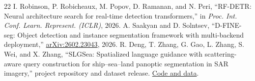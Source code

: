 \documentclass[journal]{IEEEtran}
\begin{document}
\begin{thebibliography}{22}
 I. Robinson, P. Robicheaux, M. Popov, D. Ramanan, and N. Peri, ``RF-DETR: Neural architecture search for real-time detection transformers,'' in \emph{Proc. Int. Conf. Learn. Represent. (ICLR)}, 2026.
 A. Saakyan and D. Solntsev, ``D-FINE-seg: Object detection and instance segmentation framework with multi-backend deployment,'' \href{https://arxiv.org/abs/2602.23043}{arXiv:2602.23043}, 2026.
 R. Deng, T. Zhang, G. Gao, L. Zhang, S. Wei, and X. Zhang, ``SLGSea: Spatialized language guidance with scattering-aware query construction for ship--sea--land panoptic segmentation in SAR imagery,'' project repository and dataset release. \href{https://github.com/deng1218/SLGSea}{Code and data}.
\end{thebibliography}
\end{document}
